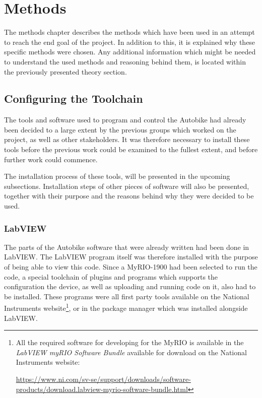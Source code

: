 \chapter{Methods}

The methods chapter describes the methods which have been used in an attempt to reach the end goal of the project. In addition to this, it is explained why these specific methods were chosen. Any additional information which might be needed to understand the used methods and reasoning behind them, is located within the previously presented theory section.

\section{Configuring the Toolchain}

The tools and software used to program and control the Autobike had already been decided to a large extent by the previous groups which worked on the project, as well as other stakeholders. It was therefore necessary to install these tools before the previous work could be examined to the fullest extent, and before further work could commence.

The installation process of these tools, will be presented in the upcoming subsections. Installation steps of other pieces of software will also be presented, together with their purpose and the reasons behind why they were decided to be used.

\subsection{LabVIEW}

The parts of the Autobike software that were already written had been done in LabVIEW. The LabVIEW program itself was therefore installed with the purpose of being able to view this code. Since a MyRIO-1900 had been selected to run the code, a special toolchain of plugins and programs which supports the configuration the device, as well as uploading and running code on it, also had to be installed. These programs were all first party tools available on the National Instruments website\footnote{All the required software for developing for the MyRIO is available in the \textit{LabVIEW myRIO Software Bundle} available for download on the National Instruments website: \raggedright\url{https://www.ni.com/sv-se/support/downloads/software-products/download.labview-myrio-software-bundle.html}}, or in the package manager which was installed alongside LabVIEW. 

